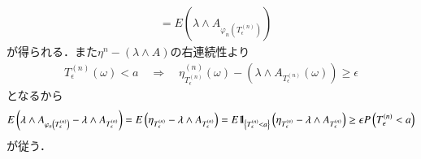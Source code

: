 \begin{prf}
\begin{description}
\begin{align}
					&= E\left(\lambda \wedge A_{\varphi_n\left(T^{(n)}_\epsilon\right)}\right)
				\end{align}
				が得られる．また$\eta^{n} - (\lambda \wedge A)$の右連続性より
				\begin{align}
					T^{(n)}_\epsilon(\omega) < a
					\quad \Longrightarrow
					\quad \eta^{(n)}_{T^{(n)}_\epsilon}(\omega) - \left(\lambda \wedge A_{T^{(n)}_\epsilon}(\omega)\right) \geq \epsilon
				\end{align}
				となるから
				\begin{align}
					E\left(\lambda \wedge A_{\varphi_n\left(T^{(n)}_\epsilon\right)}
						- \lambda \wedge A_{T^{(n)}_\epsilon} \right)
					= E\left(\eta_{T^{(n)}_\epsilon}
						- \lambda \wedge A_{T^{(n)}_\epsilon} \right)
					= E\mbox{1}\hspace{-0.25em}\mbox{l}_{\left\{T^{(n)}_\epsilon < a\right\}}\left(\eta_{T^{(n)}_\epsilon}
						- \lambda \wedge A_{T^{(n)}_\epsilon} \right)
					\geq \epsilon P\left(T^{(n)}_\epsilon < a\right)
				\end{align}
				が従う．
				

\end{description}
\end{prf}
